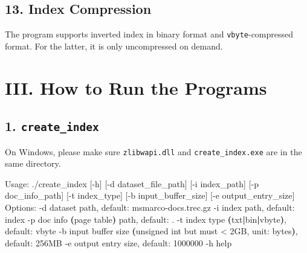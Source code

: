 \documentclass[12pt]{article}
\newenvironment{Shaded}{}{}
\newcommand{\ErrorTok}[1]{\textcolor[rgb]{1.00,0.00,0.00}{\textbf{\footnotesize #1}}}
\newcommand{\ExtensionTok}[1]{\footnotesize #1}
\newcommand{\KeywordTok}[1]{\textcolor[rgb]{0.00,0.44,0.13}{\textbf{\footnotesize #1}}}
\newcommand{\NormalTok}[1]{\footnotesize #1}
\newcommand{\OperatorTok}[1]{\textcolor[rgb]{0.40,0.40,0.40}{\footnotesize #1}}
\begin{document}
\hypertarget{13-index-compression}{%
\subsection{13. Index Compression}\label{13-index-compression}}

The program supports inverted index in binary format and
\texttt{vbyte}-compressed format. For the latter, it is only
uncompressed on demand.

\hypertarget{iii-how-to-run-the-programs}{%
\section{III. How to Run the
Programs}\label{iii-how-to-run-the-programs}}

\hypertarget{1-createindex}{%
\subsection{\texorpdfstring{1.
\texttt{create\_index}}{1. create\_index}}\label{1-createindex}}

On Windows, please make sure \texttt{zlibwapi.dll} and
\texttt{create\_index.exe} are in the same directory.

\begin{Shaded}
\begin{Highlighting}[]
\ExtensionTok{Usage:}\NormalTok{ ./create\_index [{-}h] [{-}d dataset\_file\_path] [{-}i index\_path] [{-}p doc\_info\_path]}
        \ExtensionTok{[{-}t}\NormalTok{ index\_type] [{-}b input\_buffer\_size] [{-}e output\_entry\_size]}
\ExtensionTok{Options:}
        \ExtensionTok{{-}d}\NormalTok{      dataset path, default: msmarco{-}docs.trec.gz}
        \ExtensionTok{{-}i}\NormalTok{      index path, default: index}
        \ExtensionTok{{-}p}\NormalTok{      doc info }\ErrorTok{(}\ExtensionTok{page}\NormalTok{ table}\KeywordTok{)} \ExtensionTok{path,}\NormalTok{ default: .}
        \ExtensionTok{{-}t}\NormalTok{      index type }\ErrorTok{(}\ExtensionTok{txt}\KeywordTok{|}\ExtensionTok{bin}\KeywordTok{|}\ExtensionTok{vbyte}\KeywordTok{)}\ExtensionTok{,}\NormalTok{ default: vbyte}
        \ExtensionTok{{-}b}\NormalTok{      input buffer size }\ErrorTok{(}\ExtensionTok{unsigned}\NormalTok{ int but must }\OperatorTok{\textless{}}\NormalTok{ 2GB, unit: bytes}\KeywordTok{)}\ExtensionTok{,}
                \ExtensionTok{default:}\NormalTok{ 256MB}
        \ExtensionTok{{-}e}\NormalTok{      output entry size, default: 1000000}
        \ExtensionTok{{-}h}\NormalTok{      help}
\end{Highlighting}
\end{Shaded}
\end{document}
